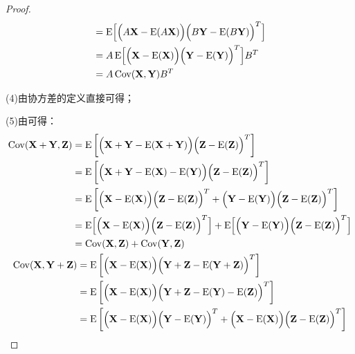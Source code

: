 \begin{proof}
\begin{align*}
		&=\operatorname{E}\Bigl[\Bigl(A\mathbf{X}-\operatorname{E}(A\mathbf{X})\Bigr)\Bigl(B\mathbf{Y}-\operatorname{E}(B\mathbf{Y})\Bigr)^T\Bigr] \\
		&=A\operatorname{E}\Bigl[\Bigl(\mathbf{X}-\operatorname{E}(\mathbf{X})\Bigr)\Bigl(\mathbf{Y}-\operatorname{E}(\mathbf{Y})\Bigr)^T\Bigr]B^T \\
		&=A\operatorname{Cov}(\mathbf{X},\mathbf{Y})B^T
	\end{align*}\par
	(4)由协方差的定义直接可得；\par
	(5)由可得：
	\begin{gather*}
		\begin{aligned}
			\operatorname{Cov}(\mathbf{X}+\mathbf{Y},\mathbf{Z})
			&=\operatorname{E}\left[\Bigl(\mathbf{X}+\mathbf{Y}-\operatorname{E}(\mathbf{X}+\mathbf{Y})\Bigr)\Bigl(\mathbf{Z}-\operatorname{E}(\mathbf{Z})\Bigr)^T\right] \\
			&=\operatorname{E}\left[\Bigl(\mathbf{X}+\mathbf{Y}-\operatorname{E}(\mathbf{X})-\operatorname{E}(\mathbf{Y})\Bigr)\Bigl(\mathbf{Z}-\operatorname{E}(\mathbf{Z})\Bigr)^T\right] \\
			&=\operatorname{E}\left[\Bigl(\mathbf{X}-\operatorname{E}(\mathbf{X})\Bigr)\Bigl(\mathbf{Z}-\operatorname{E}(\mathbf{Z})\Bigr)^T+\Bigl(\mathbf{Y}-\operatorname{E}(\mathbf{Y})\Bigr)\Bigl(\mathbf{Z}-\operatorname{E}(\mathbf{Z})\Bigr)^T\right] \\
			&=\operatorname{E}\Bigl[\Bigl(\mathbf{X}-\operatorname{E}(\mathbf{X})\Bigr)\Bigl(\mathbf{Z}-\operatorname{E}(\mathbf{Z})\Bigr)^T\Bigr]+\operatorname{E}\Bigl[\Bigl(\mathbf{Y}-\operatorname{E}(\mathbf{Y})\Bigr)\Bigl(\mathbf{Z}-\operatorname{E}(\mathbf{Z})\Bigr)^T\Bigr] \\
			&=\operatorname{Cov}(\mathbf{X},\mathbf{Z})+\operatorname{Cov}(\mathbf{Y},\mathbf{Z})
		\end{aligned} \\
		\begin{aligned}
			\operatorname{Cov}(\mathbf{X},\mathbf{Y}+\mathbf{Z})
			&=\operatorname{E}\left[\Bigl(\mathbf{X}-\operatorname{E}(\mathbf{X})\Bigr)\Bigl(\mathbf{Y}+\mathbf{Z}-\operatorname{E}(\mathbf{Y}+\mathbf{Z})\Bigr)^T\right] \\
			&=\operatorname{E}\left[\Bigl(\mathbf{X}-\operatorname{E}(\mathbf{X})\Bigr)\Bigl(\mathbf{Y}+\mathbf{Z}-\operatorname{E}(\mathbf{Y})-\operatorname{E}(\mathbf{Z})\Bigr)^T\right] \\
			&=\operatorname{E}\left[\Bigl(\mathbf{X}-\operatorname{E}(\mathbf{X})\Bigr)\Bigl(\mathbf{Y}-\operatorname{E}(\mathbf{Y})\Bigr)^T+\Bigl(\mathbf{X}-\operatorname{E}(\mathbf{X})\Bigr)\Bigl(\mathbf{Z}-\operatorname{E}(\mathbf{Z})\Bigr)^T\right] \\

\end{aligned}
\end{gather*}
\end{proof}
